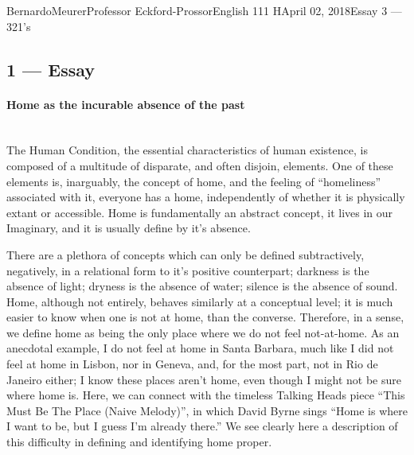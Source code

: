 \documentclass[12pt,letterpaper]{article}
\begin{document}
\begin{mla}{Bernardo}{Meurer}{Professor Eckford-Prossor}{English 111 H}{April 02, 2018}{Essay 3 --- 321's}
	\subsection*{1 --- Essay}
	\paragraph*{Home as the incurable absence of the past}  \hspace{0pt} \\
	The Human Condition, the essential characteristics of human existence, is composed of a multitude of disparate, and often disjoin, elements. One of these elements is, inarguably, the concept of home, and the feeling of ``homeliness'' associated with it, everyone has a home, independently of whether it is physically extant or accessible. Home is fundamentally an abstract concept, it lives in our Imaginary, and it is usually define by it's absence.

	There are a plethora of concepts which can only be defined subtractively, negatively, in a relational form to it's positive counterpart; darkness is the absence of light; dryness is the absence of water; silence is the absence of sound. Home, although not entirely, behaves similarly at a conceptual level; it is much easier to know when one is not at home, than the converse. Therefore, in a sense, we define home as being the only place where we do not feel not-at-home.
	As an anecdotal example, I do not feel at home in Santa Barbara, much like I did not feel at home in Lisbon, nor in Geneva, and, for the most part, not in Rio de Janeiro either; I know these places aren't home, even though I might not be sure where home is.
	Here, we can connect with the timeless Talking Heads piece ``This Must Be The Place (Naive Melody)'', in which David Byrne sings ``Home is where I want to be, but I guess I'm already there.'' We see clearly here a description of this difficulty in defining and identifying home proper.


\end{mla}
\end{document}
